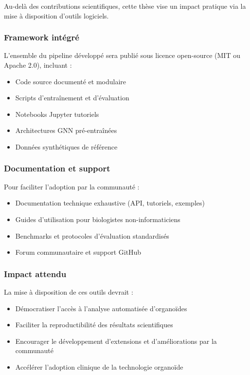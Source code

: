 Au-delà des contributions scientifiques, cette thèse vise un impact pratique via la mise à disposition d'outils logiciels.

\subsubsection{Framework intégré}

L'ensemble du pipeline développé sera publié sous licence open-source (MIT ou Apache 2.0), incluant :
\begin{itemize}
    \item Code source documenté et modulaire
    \item Scripts d'entraînement et d'évaluation
    \item Notebooks Jupyter tutoriels
    \item Architectures GNN pré-entraînées
    \item Données synthétiques de référence
\end{itemize}

\subsubsection{Documentation et support}

Pour faciliter l'adoption par la communauté :
\begin{itemize}
    \item Documentation technique exhaustive (API, tutoriels, exemples)
    \item Guides d'utilisation pour biologistes non-informaticiens
    \item Benchmarks et protocoles d'évaluation standardisés
    \item Forum communautaire et support GitHub
\end{itemize}

\subsubsection{Impact attendu}

La mise à disposition de ces outils devrait :
\begin{itemize}
    \item Démocratiser l'accès à l'analyse automatisée d'organoïdes
    \item Faciliter la reproductibilité des résultats scientifiques
    \item Encourager le développement d'extensions et d'améliorations par la communauté
    \item Accélérer l'adoption clinique de la technologie organoïde
\end{itemize}

